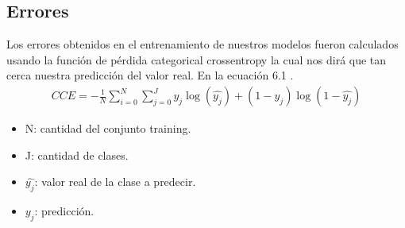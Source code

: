 \subsection{Errores }
Los errores obtenidos en el entrenamiento de nuestros modelos fueron calculados usando la función de pérdida  categorical crossentropy la cual nos dirá que tan cerca nuestra predicción del valor real. En la ecuación 6.1 .
\begin{equation}
\label{CCE}
\begin{aligned}
CCE=-\frac{1}{N}\sum_{i=0}^{N}\sum_{j=0}^{J} y_{j}\log(\hat{y_{j}})+(1-y_{j})\log(1-\hat{y_{j}})
\end{aligned}
\end{equation}
\begin{itemize}
	\item N: cantidad del conjunto training.
	\item J: cantidad de clases.
	\item $\hat{y_{j}}$: valor real de la clase a predecir.
	\item $y_{j}$: predicción.
\end{itemize}





